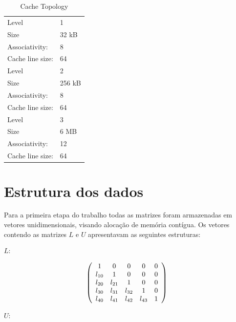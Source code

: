 \documentclass[12pt]{article}
\begin{document}
\begin{table}[H]
\centering
\caption{Cache Topology}
\label{my-label}
\begin{tabular}{ll}
Level        & 1                              \\
Size         & 32 kB                          \\
Associativity: & 8                            \\
Cache line size: &  64                        \\\hline
Level        & 2                              \\
Size         & 256 kB                         \\
Associativity: & 8                            \\
Cache line size: &  64                        \\\hline
Level        & 3                              \\
Size         & 6 MB                           \\
Associativity: & 12                           \\
Cache line size: &  64                        \\
\end{tabular}
\end{table}

\section{Estrutura dos dados} \label{sec:firstpage}

Para a primeira etapa do trabalho todas as matrizes foram armazenadas em vetores unidimensionais, visando alocação de memória contígua. Os vetores contendo as matrizes $L$ e $U$ apresentavam as seguintes estruturas:

$L$:

$$ \left(
  \begin{array}{c c c c c}
     1       & 0      & 0      & 0      & 0\\
     l_{10}  & 1      & 0      & 0      & 0\\
     l_{20}  & l_{21} & 1      & 0      & 0\\
     l_{30}  & l_{31} & l_{32} & 1      & 0\\
     l_{40}  & l_{41} & l_{42} & l_{43} & 1 \\
  \end{array} \right)
$$

$U$:
\end{document}

